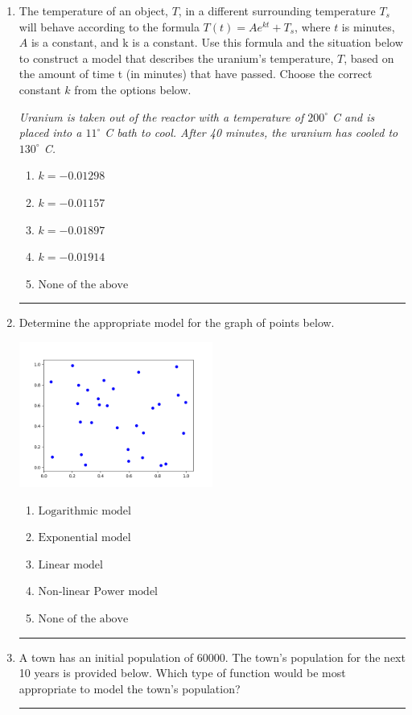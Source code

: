 \documentclass[14pt]{extbook}
\newcommand{\litem}[1]{\item#1\hspace*{-1cm}\rule{\textwidth}{0.4pt}}
\begin{document}
\begin{enumerate}
{\begin{enumerate}[label=\Alph*.]
\end{enumerate} }
\litem{
The temperature of an object, $T$, in a different surrounding temperature $T_s$ will behave according to the formula $T(t) = Ae^{kt} + T_s$, where $t$ is minutes, $A$ is a constant, and k is a constant. Use this formula and the situation below to construct a model that describes the uranium's temperature, $T$, based on the amount of time t (in minutes) that have passed. Choose the correct constant $k$ from the options below.
\begin{center}
    \textit{ Uranium is taken out of the reactor with a temperature of $200^{\circ}$ C and is placed into a $11^{\circ}$ C bath to cool. After 40 minutes, the uranium has cooled to $130^{\circ}$ C. }
\end{center}
\begin{enumerate}[label=\Alph*.]
\item \( k = -0.01298 \)
\item \( k = -0.01157 \)
\item \( k = -0.01897 \)
\item \( k = -0.01914 \)
\item \( \text{None of the above} \)

\end{enumerate} }
\litem{
Determine the appropriate model for the graph of points below.
\begin{center}
    \includegraphics[width=0.5\textwidth]{../Figures/identifyModelGraph11B.png}
\end{center}
\begin{enumerate}[label=\Alph*.]
\item \( \text{Logarithmic model} \)
\item \( \text{Exponential model} \)
\item \( \text{Linear model} \)
\item \( \text{Non-linear Power model} \)
\item \( \text{None of the above} \)

\end{enumerate} }
\litem{
A town has an initial population of 60000. The town's population for the next 10 years is provided below. Which type of function would be most appropriate to model the town's population?

}
\end{enumerate}
\end{document}
